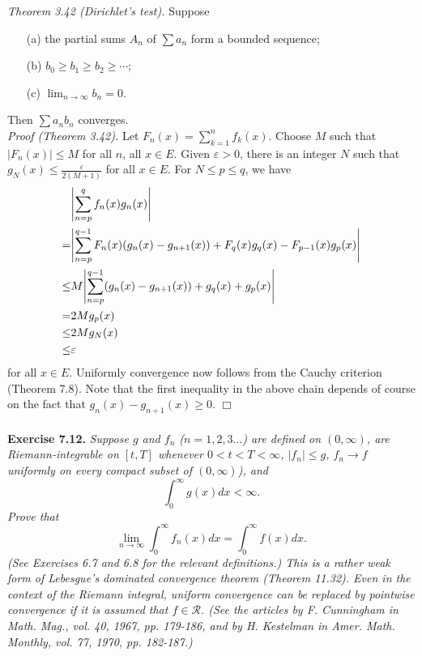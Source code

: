 \documentclass{article}
\begin{document}
\emph{Theorem 3.42 (Dirichlet's test).}
Suppose
\begin{enumerate}
  \item[(a)]
  the partial sums $A_n$ of $\sum a_n$ form a bounded sequence;
  \item[(b)]
  $b_0 \geq b_1 \geq b_2 \geq \cdots$;
  \item[(c)]
  $\lim_{n \to \infty} b_n = 0$.
\end{enumerate}
Then $\sum a_n b_n$ converges. \\



\emph{Proof (Theorem 3.42).}
Let $F_n(x) = \sum_{k=1}^{n} f_k(x)$.
Choose $M$ such that $|F_n(x)| \leq M$ for all $n$, all $x \in E$.
Given $\varepsilon > 0$,
there is an integer $N$ such that $g_N(x) \leq \frac{\varepsilon}{2(M+1)}$ for all $x \in E$.
For $N \leq p \leq q$, we have
\begin{align*}
  &\abs{\sum_{n=p}^{q} f_n(x) g_n(x)} \\
  =& \abs{\sum_{n=p}^{q-1} F_n(x)(g_n(x)-g_{n+1}(x)) + F_q(x)g_q(x) - F_{p-1}(x)g_p(x)} \\
  \leq& M \abs{\sum_{n=p}^{q-1}(g_n(x)-g_{n+1}(x)) + g_q(x) + g_p(x)} \\
  =& 2M g_p(x) \\
  \leq& 2M g_N(x) \\
  \leq& \varepsilon
\end{align*}
for all $x \in E$.
Uniformly convergence now follows from the Cauchy criterion (Theorem 7.8).
Note that the first inequality in the above chain depends of course on the fact that
$g_n(x) - g_{n+1}(x) \geq 0$.
$\Box$ \\\\






\textbf{Exercise 7.12.}
\emph{Suppose $g$ and $f_n$ ($n=1,2,3\ldots$) are defined on $(0,\infty)$,
are Riemann-integrable on $[t,T]$ whenever $0 < t < T < \infty$,
$|f_n| \leq g$, $f_n \to f$ uniformly on every compact subset of $(0,\infty)$),
and
\[
  \int_{0}^{\infty} g(x)dx < \infty.
\]
Prove that
\[
  \lim_{n \to \infty} \int_{0}^{\infty} f_n(x)dx = \int_{0}^{\infty} f(x)dx.
\]
(See Exercises 6.7 and 6.8 for the relevant definitions.)
This is a rather weak form of Lebesgue's dominated convergence theorem (Theorem 11.32).
Even in the context of the Riemann integral,
uniform convergence can be replaced by pointwise convergence if
it is assumed that $f \in \mathscr{R}$.
(See the articles by F. Cunningham in Math. Mag., vol. 40, 1967, pp. 179-186,
and by H. Kestelman in Amer. Math. Monthly, vol. 77, 1970, pp. 182-187.)} \\
\end{document}
